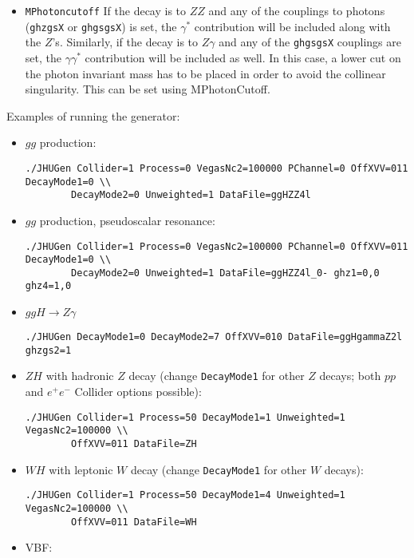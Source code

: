 \documentclass[aps,superscriptaddress,nofootinbib]{revtex4}
\begin{document}
\begin{itemize}
\item \verb|MPhotoncutoff| If the decay is to $ZZ$ and any of the couplings to photons (\verb|ghzgsX| or \verb|ghgsgsX|) is set, the $\gamma^*$ contribution will be included along with the $Z$'s.  Similarly, if the decay is to $Z\gamma$ and any of the \verb|ghgsgsX| couplings are set, the $\gamma\gamma^*$ contribution will be included as well.  In this case, a lower cut on the photon invariant mass has to be placed in order to avoid the collinear singularity.  This can be set using MPhotonCutoff.
\end{itemize}

Examples of running the generator:
\begin{itemize}
\item $gg$ production:
\begin{verbatim}
./JHUGen Collider=1 Process=0 VegasNc2=100000 PChannel=0 OffXVV=011 DecayMode1=0 \\
		DecayMode2=0 Unweighted=1 DataFile=ggHZZ4l
\end{verbatim}
\item $gg$ production, pseudoscalar resonance:
\begin{verbatim}
./JHUGen Collider=1 Process=0 VegasNc2=100000 PChannel=0 OffXVV=011 DecayMode1=0 \\
		DecayMode2=0 Unweighted=1 DataFile=ggHZZ4l_0- ghz1=0,0 ghz4=1,0
\end{verbatim}
\item $ggH \to Z\gamma$
\begin{verbatim}
./JHUGen DecayMode1=0 DecayMode2=7 OffXVV=010 DataFile=ggHgammaZ2l ghzgs2=1
\end{verbatim}
\item $ZH$ with hadronic $Z$ decay (change \verb|DecayMode1| for other $Z$ decays; both $pp$ and $e^+e^-$ Collider options possible):
\begin{verbatim}
./JHUGen Collider=1 Process=50 DecayMode1=1 Unweighted=1 VegasNc2=100000 \\
		OffXVV=011 DataFile=ZH
\end{verbatim}
\item $WH$ with leptonic $W$ decay (change \verb|DecayMode1| for other $W$ decays):
\begin{verbatim}
./JHUGen Collider=1 Process=50 DecayMode1=4 Unweighted=1 VegasNc2=100000 \\
		OffXVV=011 DataFile=WH
\end{verbatim}
\item VBF:
\begin{verbatim}

\end{verbatim}
\end{itemize}
\end{document}
